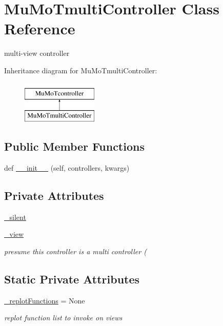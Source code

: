 \hypertarget{class_mu_mo_t_1_1_mu_mo_tmulti_controller}{}\section{Mu\+Mo\+Tmulti\+Controller Class Reference}
\label{class_mu_mo_t_1_1_mu_mo_tmulti_controller}


multi-\/view controller  


Inheritance diagram for Mu\+Mo\+Tmulti\+Controller\+:\begin{figure}[H]
\begin{center}
\leavevmode
\includegraphics[height=2.000000cm]{class_mu_mo_t_1_1_mu_mo_tmulti_controller}
\end{center}
\end{figure}
\subsection*{Public Member Functions}
\begin{DoxyCompactItemize}
\item 
def \hyperlink{class_mu_mo_t_1_1_mu_mo_tmulti_controller_a5d04c30f0b85d1b7f2aa0fb1b23dca97}{\+\_\+\+\_\+init\+\_\+\+\_\+} (self, controllers, kwargs)
\end{DoxyCompactItemize}
\subsection*{Private Attributes}
\begin{DoxyCompactItemize}
\item 
\hyperlink{class_mu_mo_t_1_1_mu_mo_tmulti_controller_a909146a3c119c927727c7d533042b184}{\+\_\+silent}
\item 
\hyperlink{class_mu_mo_t_1_1_mu_mo_tmulti_controller_a27dd8543b5188cdfe40f622d267fe2c5}{\+\_\+view}
\begin{DoxyCompactList}\small\item\em presume this controller is a multi controller ( \end{DoxyCompactList}\end{DoxyCompactItemize}
\subsection*{Static Private Attributes}
\begin{DoxyCompactItemize}
\item 
\hyperlink{class_mu_mo_t_1_1_mu_mo_tmulti_controller_a223edb833bfba55f245278156e2cb598}{\+\_\+replot\+Functions} = None
\begin{DoxyCompactList}\small\item\em replot function list to invoke on views \end{DoxyCompactList}\end{DoxyCompactItemize}


